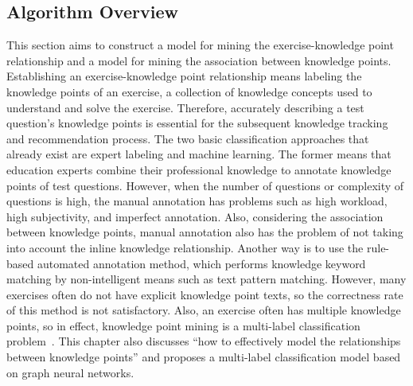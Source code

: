 \subsection{Algorithm Overview}

This section aims to construct a model for mining the exercise-knowledge point relationship and a model for mining the association between knowledge points. Establishing an exercise-knowledge point relationship means labeling the knowledge points of an exercise, a collection of knowledge concepts used to understand and solve the exercise. Therefore, accurately describing a test question's knowledge points is essential for the subsequent knowledge tracking and recommendation process. The two basic classification approaches that already exist are expert labeling and machine learning. The former means that education experts combine their professional knowledge to annotate knowledge points of test questions. However, when the number of questions or complexity of questions is high, the manual annotation has problems such as high workload, high subjectivity, and imperfect annotation. Also, considering the association between knowledge points, manual annotation also has the problem of not taking into account the inline knowledge relationship. Another way is to use the rule-based automated annotation method, which performs knowledge keyword matching by non-intelligent means such as text pattern matching. However, many exercises often do not have explicit knowledge point texts, so the correctness rate of this method is not satisfactory. Also, an exercise often has multiple knowledge points, so in effect, knowledge point mining is a multi-label classification problem~\cite{tsoumakas2007multi,zhang2013review,liu2020emerging}. This chapter also discusses ``how to effectively model the relationships between knowledge points'' and proposes a multi-label classification model based on graph neural networks.


